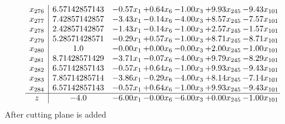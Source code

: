 \documentclass[8pt]{article}
\begin{document}
\[\begin{array}{c| c c@{\hskip 2pt} c@{\hskip 2pt} c@{\hskip 2pt} c@{\hskip 2pt} c@{\hskip 2pt} }
 x_{276}   &  6.57142857143 & -0.57 x_{1} & +  0.64 x_{6} & -1.00 x_{3} & +  9.93 x_{245} & -9.43 x_{101}\\
 x_{277}   &  7.42857142857 & -3.43 x_{1} & -0.14 x_{6} & -4.00 x_{3} & +  8.57 x_{245} & -7.57 x_{101}\\
 x_{278}   &  2.42857142857 & -1.43 x_{1} & -0.14 x_{6} & -1.00 x_{3} & +  2.57 x_{245} & -1.57 x_{101}\\
 x_{279}   &  5.28571428571 & -0.29 x_{1} & +  0.57 x_{6} & -1.00 x_{3} & +  8.71 x_{245} & -8.71 x_{101}\\
 x_{280}   &  1.0 & -0.00 x_{1} & +  0.00 x_{6} & -0.00 x_{3} & +  2.00 x_{245} & -1.00 x_{101}\\
 x_{281}   &  8.71428571429 & -3.71 x_{1} & -0.07 x_{6} & -4.00 x_{3} & +  9.79 x_{245} & -8.29 x_{101}\\
 x_{282}   &  6.57142857143 & -0.57 x_{1} & +  0.64 x_{6} & -1.00 x_{3} & +  9.93 x_{245} & -9.43 x_{101}\\
 x_{283}   &  7.85714285714 & -3.86 x_{1} & -0.29 x_{6} & -4.00 x_{3} & +  8.14 x_{245} & -7.14 x_{101}\\
 x_{284}   &  6.57142857143 & -0.57 x_{1} & +  0.64 x_{6} & -1.00 x_{3} & +  9.93 x_{245} & -9.43 x_{101}\\
\hline
z    &  -4.0 & -6.00 x_{1} & -0.00 x_{6} & -6.00 x_{3} & +  0.00 x_{245} & -1.00 x_{101}\\
\end{array}\]
 After cutting plane is added 
\end{document}
